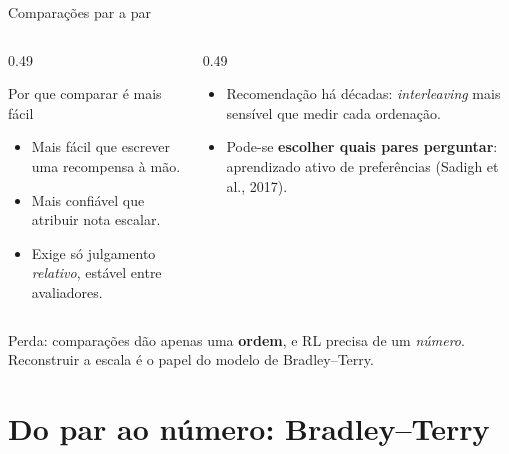 \documentclass[aspectratio=169, 11pt]{beamer}
\begin{document}
\begin{frame}{Comparações par a par}

  \vspace{-0.2em}
  \begin{columns}[T]
  \begin{column}{0.49\textwidth}
    \begin{defbox}{Por que comparar é mais fácil}
      \begin{itemize}\setlength{\itemsep}{0.15ex}
        \item Mais fácil que escrever uma recompensa à mão.
        \item Mais confiável que atribuir nota escalar.
        \item Exige só julgamento \emph{relativo}, estável entre avaliadores.
      \end{itemize}
    \end{defbox}
  \end{column}
  \begin{column}{0.49\textwidth}
    \begin{itemize}\setlength{\itemsep}{0.3ex}
      \item Recomendação há décadas: \emph{interleaving} mais sensível que
        medir cada ordenação.
      \item Pode-se \textbf{escolher quais pares perguntar}: aprendizado ativo
        de preferências {\scriptsize(Sadigh et al., 2017)}.
    \end{itemize}
  \end{column}
  \end{columns}

  \begin{alertabox}
    Perda: comparações dão apenas uma \textbf{ordem}, e RL precisa de um
    \emph{número}. Reconstruir a escala é o papel do modelo de Bradley--Terry.
  \end{alertabox}
\end{frame}

\section{Do par ao número: Bradley--Terry}
\end{document}
